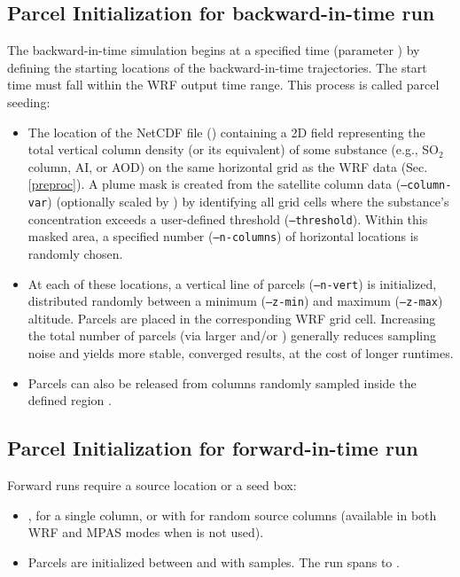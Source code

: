 \documentclass[11pt]{article}
\begin{document}
\subsection{Parcel Initialization for backward-in-time run}
The backward-in-time simulation begins at a specified time (parameter ) by defining the starting locations of the backward-in-time trajectories. The start time must fall within the WRF output time range. This process is called parcel seeding:
\begin{itemize}
    \item The location of the NetCDF file () containing a 2D field representing the total vertical column density (or its equivalent) of some substance (e.g., SO$_2$ column, AI, or AOD) on the same horizontal grid as the WRF data (Sec. \ref{preproc}). A plume mask is created from the satellite column data (\texttt{--column-var}) (optionally scaled by )  by identifying all grid cells where the substance's concentration exceeds a user-defined threshold (\texttt{--threshold}). Within this masked area, a specified number (\texttt{--n-columns}) of horizontal locations is randomly chosen.
    \item At each of these locations, a vertical line of parcels (\texttt{--n-vert}) is initialized, distributed randomly between a minimum (\texttt{--z-min}) and maximum (\texttt{--z-max}) altitude. Parcels are placed in the corresponding WRF grid cell. Increasing the total number of parcels (via larger  and/or ) generally reduces sampling noise and yields more stable, converged results, at the cost of longer runtimes.
    \item Parcels can also be released from columns randomly sampled inside the defined region .
\end{itemize}


\subsection{Parcel Initialization for forward-in-time run}
Forward runs require a source location or a seed box:
\begin{itemize}
  \item {},  for a single column, or  with  for random source columns (available in both WRF and MPAS modes when  is not used).
  \item Parcels are initialized between  and  with  samples. The run spans  to .  
\end{itemize}
\end{document}
